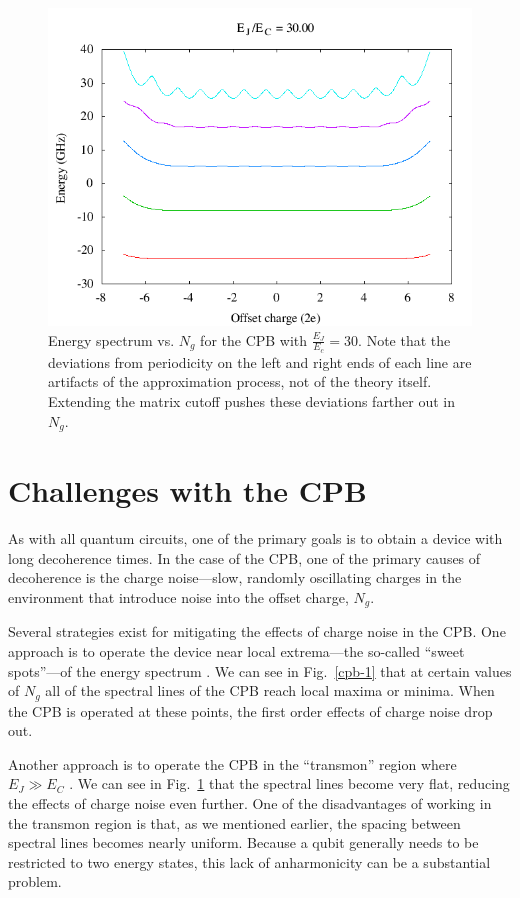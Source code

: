 \documentclass[twocolumn]{revtex4}
\begin{document}
\begin{figure}
  \includegraphics[width=\linewidth]{CPB-30.png}
  \caption{Energy spectrum vs. $N_g$ for the CPB with
    $\frac{E_J}{E_c}=30$. Note that the deviations from periodicity on
    the left and right ends of each line are artifacts of the
    approximation process, not of the theory itself. Extending the
    matrix cutoff pushes these deviations farther out in $N_g$.}
  \label{cpb-30}
\end{figure}

\section{Challenges with the CPB}
As with all quantum circuits, one of the primary goals is to obtain a
device with long decoherence times. In the case of the CPB, one of the
primary causes of decoherence is the charge noise---slow, randomly
oscillating charges in the environment that introduce noise into the
offset charge, $N_g$.

Several strategies exist for mitigating the effects of charge noise in
the CPB. One approach is to operate the device near local
extrema---the so-called ``sweet spots''---of the energy
spectrum \cite{Vion}. We can see in Fig.~\ref{cpb-1} that at certain
values of $N_g$ all of the spectral lines of the CPB reach local
maxima or minima. When the CPB is operated at these points, the first
order effects of charge noise drop out.

Another approach is to operate the CPB in the ``transmon'' region
where $E_J\gg E_C$ \cite{Koch}. We can see in Fig.~\ref{cpb-30} that the
spectral lines become very flat, reducing the effects of charge noise
even further. One of the disadvantages of working in the transmon
region is that, as we mentioned earlier, the spacing between spectral
lines becomes nearly uniform. Because a qubit generally needs to be
restricted to two energy states, this lack of anharmonicity can be a
substantial problem.
\end{document}
